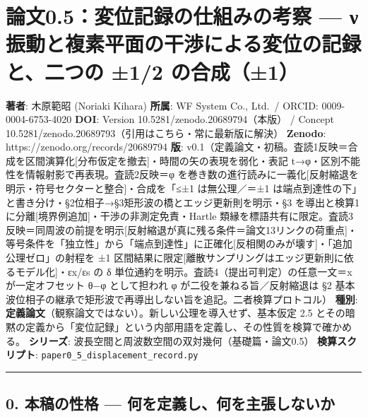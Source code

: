 \documentclass[
]{ltjsarticle}
\author{}
\date{}
\begin{document}
\section{論文0.5：変位記録の仕組みの考察 --- ν
振動と複素平面の干渉による変位の記録と、二つの ±1/2
の合成（±1）}\label{ux8ad6ux65870.5ux5909ux4f4dux8a18ux9332ux306eux4ed5ux7d44ux307fux306eux8003ux5bdf-ux3bd-ux632fux52d5ux3068ux8907ux7d20ux5e73ux9762ux306eux5e72ux6e09ux306bux3088ux308bux5909ux4f4dux306eux8a18ux9332ux3068ux4e8cux3064ux306e-12-ux306eux5408ux62101}

\textbf{著者}: 木原範昭 (Noriaki Kihara) \textbf{所属}: WF System Co.,
Ltd.~/ ORCID: 0009-0004-6753-4020 \textbf{DOI}: Version
10.5281/zenodo.20689794（本版） / Concept
10.5281/zenodo.20689793（引用はこちら・常に最新版に解決）
\textbf{Zenodo}: https://zenodo.org/records/20689794 \textbf{版}:
v0.1（定義論文・初稿。査読1反映＝合成を区間演算化{[}分布仮定を撤去{]}・時間の矢の表現を弱化・表記
t→φ・区別不能性を情報射影で再表現。査読2反映＝φ
を巻き数の進行読みに一義化{[}反射縮退を明示・符号セクターと整合{]}・合成を「≤±1
は無公理／＝±1
は端点到達性の下」と書き分け・§2位相子→§3矩形波の橋とエッジ更新則を明示・§3
を導出と検算1に分離{[}境界例追加{]}・干渉の非測定免責・Hartle
類縁を標語共有に限定。査読3反映＝同周波の前提を明示{[}反射縮退が真に残る条件＝論文13リンクの荷重点{]}・等号条件を「独立性」から「端点到達性」に正確化{[}反相関のみが壊す{]}・「追加公理ゼロ」の射程を
±1
区間結果に限定{[}離散サンプリングはエッジ更新則に依るモデル化{]}・εx/εs
の δ 単位通約を明示。査読4（提出可判定）の任意一文＝x が一定オフセット
θ−φ として担われ φ が二役を兼ねる旨／反射縮退は §2
基本波位相子の継承で矩形波で再導出しない旨を追記。二者検算プロトコル）
\textbf{種別}:
\textbf{定義論文}（観察論文ではない）。新しい公理を導入せず、基本仮定
2.5
とその暗黙の定義から「変位記録」という内部用語を定義し、その性質を検算で確かめる。
\textbf{シリーズ}: 波長空間と周波数空間の双対幾何（基礎篇・論文0.5）
\textbf{検算スクリプト}: \texttt{paper0\_5\_displacement\_record.py}

\begin{center}\rule{0.5\linewidth}{0.5pt}\end{center}

\subsection{0. 本稿の性格 ---
何を定義し、何を主張しないか}\label{ux672cux7a3fux306eux6027ux683c-ux4f55ux3092ux5b9aux7fa9ux3057ux4f55ux3092ux4e3bux5f35ux3057ux306aux3044ux304b}
\end{document}
